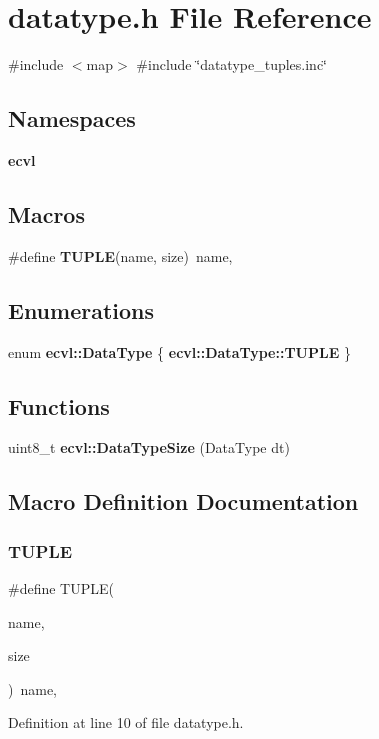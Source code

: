 \section{datatype.\+h File Reference}
\label{datatype_8h}
{\ttfamily \#include $<$map$>$}\newline
{\ttfamily \#include \char`\"{}datatype\+\_\+tuples.\+inc\char`\"{}}\newline
\subsection*{Namespaces}
\begin{DoxyCompactItemize}
\item 
 \textbf{ ecvl}
\end{DoxyCompactItemize}
\subsection*{Macros}
\begin{DoxyCompactItemize}
\item 
\#define \textbf{ T\+U\+P\+LE}(name,  size)~name,
\end{DoxyCompactItemize}
\subsection*{Enumerations}
\begin{DoxyCompactItemize}
\item 
enum \textbf{ ecvl\+::\+Data\+Type} \{ \textbf{ ecvl\+::\+Data\+Type\+::\+T\+U\+P\+LE}
 \}
\end{DoxyCompactItemize}
\subsection*{Functions}
\begin{DoxyCompactItemize}
\item 
uint8\+\_\+t \textbf{ ecvl\+::\+Data\+Type\+Size} (Data\+Type dt)
\end{DoxyCompactItemize}


\subsection{Macro Definition Documentation}
\mbox{\label{datatype_8h_a53188e9f90fa65ea3cfdd52151b550cc}} 
\subsubsection{TUPLE}
{\footnotesize\ttfamily \#define T\+U\+P\+LE(\begin{DoxyParamCaption}\item[{}]{name,  }\item[{}]{size }\end{DoxyParamCaption})~name,}



Definition at line 10 of file datatype.\+h.

